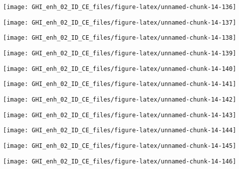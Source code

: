 \documentclass[
  10pt,
  a4paper,oneside]{article}
\begin{document}
\begin{center}\texttt{[image: GHI\_enh\_02\_ID\_CE\_files/figure-latex/unnamed-chunk-14-136]} \end{center}

\begin{center}\texttt{[image: GHI\_enh\_02\_ID\_CE\_files/figure-latex/unnamed-chunk-14-137]} \end{center}

\begin{center}\texttt{[image: GHI\_enh\_02\_ID\_CE\_files/figure-latex/unnamed-chunk-14-138]} \end{center}

\begin{center}\texttt{[image: GHI\_enh\_02\_ID\_CE\_files/figure-latex/unnamed-chunk-14-139]} \end{center}

\begin{center}\texttt{[image: GHI\_enh\_02\_ID\_CE\_files/figure-latex/unnamed-chunk-14-140]} \end{center}

\begin{center}\texttt{[image: GHI\_enh\_02\_ID\_CE\_files/figure-latex/unnamed-chunk-14-141]} \end{center}

\begin{center}\texttt{[image: GHI\_enh\_02\_ID\_CE\_files/figure-latex/unnamed-chunk-14-142]} \end{center}

\begin{center}\texttt{[image: GHI\_enh\_02\_ID\_CE\_files/figure-latex/unnamed-chunk-14-143]} \end{center}

\begin{center}\texttt{[image: GHI\_enh\_02\_ID\_CE\_files/figure-latex/unnamed-chunk-14-144]} \end{center}

\begin{center}\texttt{[image: GHI\_enh\_02\_ID\_CE\_files/figure-latex/unnamed-chunk-14-145]} \end{center}

\begin{center}\texttt{[image: GHI\_enh\_02\_ID\_CE\_files/figure-latex/unnamed-chunk-14-146]} \end{center}
\end{document}
